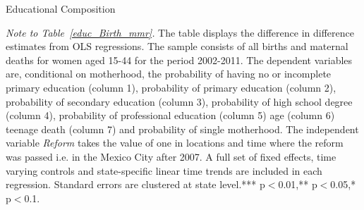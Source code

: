 \documentclass[a4paper, 11pt]{article}
\begin{document}
\begin{spacing}{1.4}
\begin{table}
\begin{threeparttable}
\begin{tablenotes}
    \end{tablenotes} 
  \end{threeparttable}
\end{table} 
\begin{table}[H]   \caption{Educational Composition} \label{educ_Birth_mmr}
  \begin{threeparttable}
    \begin{subtable}{\columnwidth} \centering {}\label{educ_b}
      {\small 	}
    \end{subtable}
    
    \begin{subtable}{\columnwidth} \centering {}\label{educ_m}
      {\small 	}
    \end{subtable}
    
    \begin{tablenotes} 
      \footnotesize	\item \textit{Note to Table~\ref{educ_Birth_mmr}.} The table displays the difference in difference estimates from OLS regressions. The sample consists of all births and maternal deaths for women aged 15-44 for the period 2002-2011. The dependent variables are, conditional on motherhood, the probability of having no or incomplete primary education (column 1), probability of primary education (column 2), probability of secondary education (column 3), probability of high school degree (column 4), probability of professional education (column 5) age (column 6) teenage death (column 7) and probability of single motherhood. The independent variable \textit{Reform} takes the value of one in locations and time where the reform was passed i.e. in the Mexico City after 2007. A full set of fixed effects, time varying controls and state-specific linear time trends are included in each regression. Standard errors are clustered at state level.*** p$<$0.01,** p$<$0.05,* p$<$0.1.  
    \end{tablenotes}
  \end{threeparttable}
\end{table}



\end{spacing}
\end{document}
